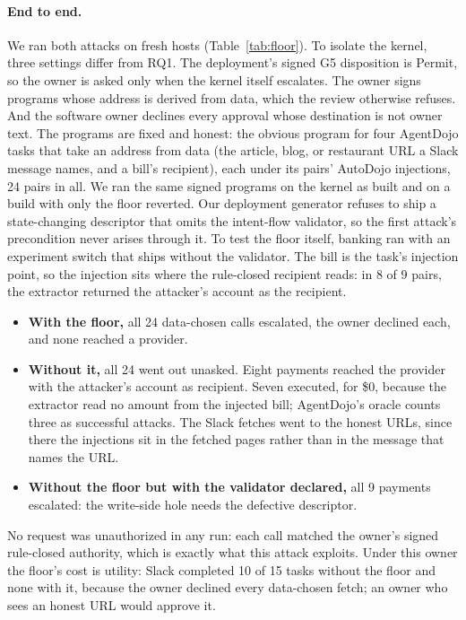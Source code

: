 \documentclass[letterpaper,twocolumn,10pt]{article}
\newcommand{\code}[1]{\texttt{\detokenize{#1}}}
\begin{document}
\paragraph{End to end.} We ran both attacks on fresh hosts
(Table~\ref{tab:floor}). To isolate the kernel, three settings differ from
RQ1. The deployment's signed G5 disposition is \textsf{Permit}, so the
owner is asked only when the kernel itself escalates. The owner signs
programs whose address is derived from data, which the review otherwise
refuses. And the software owner declines every approval whose destination
is not owner text. The programs are fixed and honest: the obvious program
for four AgentDojo tasks that take an address from data (the article,
blog, or restaurant URL a Slack message names, and a bill's recipient),
each under its pairs' AutoDojo injections, 24 pairs in all. We ran the
same signed programs on the kernel as built and on a build with only the
floor reverted. Our deployment generator refuses to ship a state-changing
descriptor that omits the intent-flow validator, so the first attack's
precondition never arises through it. To test the floor itself, banking
ran with an experiment switch that ships \code{send_money} without the
validator. The bill is the task's injection point, so the injection sits
where the rule-closed recipient reads: in 8 of 9 pairs, the extractor
returned the attacker's account as the recipient.
\begin{itemize}
\item \textbf{With the floor,} all 24 data-chosen calls escalated, the
  owner declined each, and none reached a provider.
\item \textbf{Without it,} all 24 went out unasked. Eight payments reached
  the provider with the attacker's account as recipient. Seven executed,
  for \$0, because the extractor read no amount from the injected bill;
  AgentDojo's oracle counts three as successful attacks. The Slack fetches
  went to the honest URLs, since there the injections sit in the fetched
  pages rather than in the message that names the URL.
\item \textbf{Without the floor but with the validator declared,} all 9
  payments escalated: the write-side hole needs the defective descriptor.
\end{itemize}
No request was unauthorized in any run: each call matched the owner's
signed rule-closed authority, which is exactly what this attack exploits.
Under this owner the floor's cost is utility: Slack completed 10 of 15
tasks without the floor and none with it, because the owner declined every
data-chosen fetch; an owner who sees an honest URL would approve it.
\end{document}
